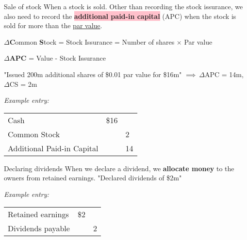 \begin{theorem}
    {Sale of stock}
    When a stock is sold. Other than recording the stock issurance, we also need to record the \colorbox{pink}{\textbf{additional paid-in capital}} (APC) when the stock is sold for more than the \hyperref[def:par_market]{par value}.

    \begin{center}
        $\Delta$\textbf{C}ommon \textbf{S}tock = Stock Issurance = Number of shares $\times$ Par value

        $\Delta$\textbf{APC} = Value - Stock Issurance
    \end{center}
    \tcblower
    "Issued 200m additional shares of \$0.01 par value for \$16m" $\implies\ \Delta$APC = 14m, $\Delta$CS = 2m

    \vspace{1em}

    \textit{Example entry:}
    \begin{tabular}{|lll|}
        \hline
        Cash                             & \$16 &    \\
        \quad Common Stock               &      & 2  \\
        \quad Additional Paid-in Capital &      & 14 \\
        \hline
    \end{tabular}
    \label{def:sale_of_stock}
\end{theorem}

\begin{theorem}
    {Declaring dividends}
    When we declare a dividend, we \textbf{allocate money} to the owners from retained earnings.
    \tcblower
    "Declared dividends of \$2m"

    \vspace{1em}
    \textit{Example entry:}
    \begin{tabular}{|lll|}
        \hline
        Retained earnings       & \$2 &   \\
        \quad Dividends payable &     & 2 \\
        \hline
    \end{tabular}
\end{theorem}

